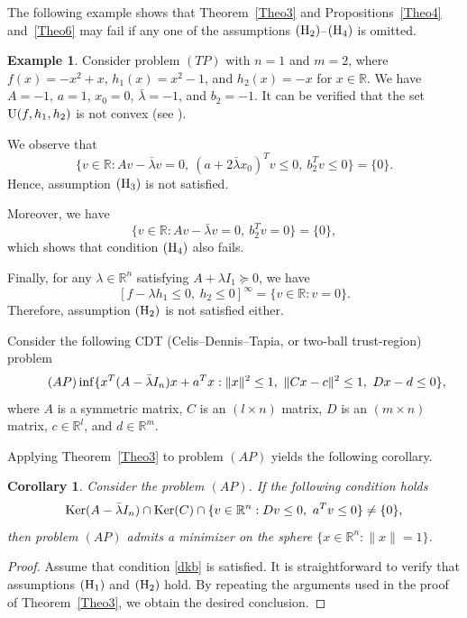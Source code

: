 \documentclass[]{interact}
\theoremstyle{plain}%
\newtheorem{corollary}[theorem]{Corollary}
\theoremstyle{definition}
\newtheorem{example}[theorem]{Example}
\theoremstyle{remark}
\begin{document}
	The following example shows that Theorem~\ref{Theo3} and
	Propositions~\ref{Theo4} and~\ref{Theo6} may fail if any one of the
	assumptions ${\rm (H_2)}$--${\rm (H_4)}$ is omitted.
	
	\begin{example}\label{ex3}
		Consider  problem $(TP)$ with $n=1$ and $m=2$, where
		$f(x)=-x^2+x$, $h_1(x)=x^2-1$, and $h_2(x)=-x$ for $x\in\mathbb{R}$.
		We have $A=-1$, $a=1$, $x_0=0$, $\bar\lambda=-1$, and $b_2=-1$.
		It can be verified that the set ${\rm U}(f,h_1,h_2)$ is not convex
		(see \cite[Example~2.1]{JeyakumarLi2014}).
		
		We observe that
		\[
		\{v\in\mathbb{R}: Av-\bar\lambda v=0,\ (a+2\bar\lambda x_0)^Tv\le0,\ b_2^Tv\le0\}
		=\{0\}.
		\]
		Hence, assumption ${\rm (H_3)}$ is not satisfied.
		
		Moreover, we have
		\[
		\{v\in\mathbb{R}: Av-\bar\lambda v=0,\ b_2^Tv=0\}
		=\{0\},
		\]
		which shows that condition ${\rm (H_4)}$ also fails.
		
		Finally, for any $\lambda\in \mathbb{R}^n$ satisfying $A+\lambda I_1\succeq 0$, we have
		\[
		[f-\lambda h_1\le0,\ h_2\le0]^\infty
		=\{v\in\mathbb{R}: v=0\}.
		\]
		Therefore, assumption ${\rm (H_2)}$ is not satisfied either.
	\end{example}
	
	Consider the following CDT (Celis--Dennis--Tapia, or two-ball trust-region) problem
	\begin{equation}\tag{{\rm $AP$}}
		\inf\{x^T(A-\bar \lambda I_n)x+a^Tx: \|x\|^2\leq 1,\ \|Cx-c\|^2\leq 1,\ Dx-d\leq 0\},
	\end{equation}
	where $A$ is a symmetric matrix, $C$ is an $(l\times n)$ matrix, $D$ is an $(m\times n)$ matrix, $c\in \mathbb{R}^l$, and $d\in \mathbb{R}^m$.
	
	Applying Theorem~\ref{Theo3} to problem {\rm $(AP)$} yields the following corollary.
	
	\begin{corollary}\label{cor1}
		Consider the problem {\rm $(AP)$}. If the following condition holds
		\begin{equation}\label{dkb}
			{\rm Ker}(A-\bar \lambda I_n)\cap {\rm Ker}(C)\cap \{v\in \mathbb{R}^n: Dv\leq 0,\ a^Tv\leq 0\}\neq\{0\},
		\end{equation}
		then problem {\rm $(AP)$} admits a minimizer on the sphere
		$\{x\in \mathbb{R}^n:\|x\|=1\}$.
	\end{corollary}
	
	\begin{proof}
		Assume that condition \eqref{dkb} is satisfied. It is straightforward to verify that assumptions ${\rm (H_1)}$ and ${\rm (H_2)}$ hold. By repeating the arguments used in the proof of Theorem~\ref{Theo3}, we obtain the desired conclusion.
	\end{proof}
	
\end{document}
